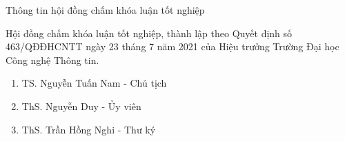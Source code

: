 \begin{preface}{Thông tin hội đồng chấm khóa luận tốt nghiệp}
 
Hội đồng chấm khóa luận tốt nghiệp, thành lập theo Quyết định số 463/QĐĐHCNTT ngày 23 tháng 7 năm 2021 của Hiệu trưởng Trường Đại học Công nghệ
Thông tin.
    \begin{enumerate}
        \item TS. Nguyễn Tuấn Nam        -       Chủ tịch 
        \item ThS. Nguyễn Duy         -       Ủy viên
        \item ThS. Trần Hồng Nghi         -       Thư ký
    \end{enumerate}
\end{preface}
